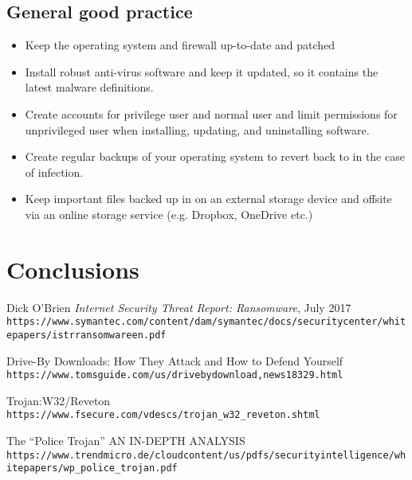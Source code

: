 \documentclass[10pt,a4paper]{article}
\begin{document}
\subsection{General good practice}
\begin{itemize}
\item Keep the operating system and firewall up-to-date and patched
\item Install robust anti-virus software and keep it updated, so it contains the latest malware definitions.
\item Create accounts for privilege user and normal user and limit permissions for unprivileged user when installing, updating, and uninstalling software.
\item Create regular backups of your operating system to revert back to in the case of infection.
\item Keep important files backed up in on an external storage device and offsite via an online storage service (e.g. Dropbox, OneDrive etc.)
\end{itemize}


\section{Conclusions}

\newpage

\begin{thebibliography}{1}

Dick O’Brien
\textit{Internet Security Threat Report: Ransomware}, July 2017
\\\texttt{https://www.symantec.com/content/dam/symantec/docs/security\-center/white\-papers/istr\-ransomware\-en.pdf}

Drive-By Downloads: How They Attack and How to Defend Yourself
\\\texttt{https://www.tomsguide.com/us/driveby\-download,news\-18329.html}

Trojan:W32/Reveton
\\\texttt{https://www.f\-secure.com/v\-descs/trojan\_w32\_reveton.shtml}

The “Police Trojan”
AN IN-DEPTH ANALYSIS
\\\texttt{https://www.trendmicro.de/cloud\-content/us/pdfs/security\-intelligence/white\-papers/wp\_police\_trojan.pdf}

\end{thebibliography}
\end{document}

